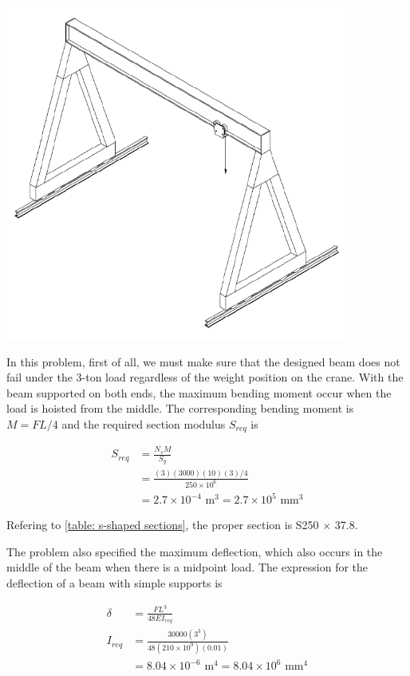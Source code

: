 \documentclass[a4paper,openany,nobib]{tufte-book}
\begin{document}
{{\begin{center}
\includegraphics[width=.9\linewidth]{pictures/Simple-load-bearing/gantry-crane.png}
\end{center}

In this problem, first of all, we must make sure that the designed beam
does not fail under the 3-ton load regardless of the weight position on
the crane. With the beam supported on both ends, the maximum bending
moment occur when the load is hoisted from the middle. The corresponding
bending moment is \(M = FL / 4\) and the required section modulus
\(S_{req}\) is

$$\begin{aligned}
    S_{req} &= \frac{N_s M}{S_y} \\
            &= \frac{(3)(3000)(10)(3)/4}{250 \times 10^6} \\
            &= 2.7 \times 10^{-4} \text{ m}^3 = 2.7 \times 10^5 \text{ mm}^3
  \end{aligned}$$

Refering to \ref{table: s-shaped sections},
the proper section is S250 \(\times\) 37.8.

The problem also specified the maximum deflection, which also occurs in
the middle of the beam when there is a midpoint load. The expression for
the deflection of a beam with simple supports is

$$\begin{aligned}
    \delta &= \frac{FL^3}{48EI_{req}} \\
    I_{req} &= \frac{30000(3^3)}{48(210 \times 10^9)(0.01)} \\
           &= 8.04 \times 10^{-6} \text{ m}^4 = 8.04 \times 10^6 \text{ mm}^4
  \end{aligned}$$

}}
\end{document}
